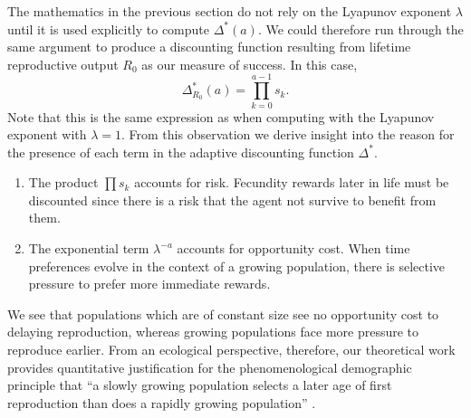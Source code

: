 \documentclass[titlepage, hidelinks, 12pt]{article}
\theoremstyle{plain}
\theoremstyle{remark}
\theoremstyle{definition}
\begin{document}
The mathematics in the previous section do not rely on the Lyapunov exponent $\lambda$ until it is used
explicitly to compute $\Delta^*(a)$. We could therefore
run through the same argument to produce a discounting function resulting from lifetime reproductive output $R_0$ as our measure of success. In this
case, 
\begin{equation}
    \Delta_{R_0}^*(a) = \prod\limits_{k = 0}^{a-1} s_k.
\end{equation}
Note that this is the same expression as when computing with the Lyapunov exponent with $\lambda = 1$. From this observation we derive insight into
the reason for the presence of each term in the adaptive discounting function $\Delta^*$. 
\begin{enumerate}
    \item The product $\prod s_k$ accounts for risk. Fecundity rewards later in life must be discounted since there is a risk that the
        agent not survive to benefit from them.
    \item The exponential term $\lambda^{-a}$ accounts for opportunity cost. When time preferences evolve in the context of a growing
        population, there is selective pressure to prefer more immediate rewards. 
\end{enumerate}

We see that populations which are of constant size see no opportunity cost to delaying
reproduction, whereas growing populations face more pressure to reproduce earlier. 
From an ecological perspective, therefore, our theoretical work provides quantitative justification for the phenomenological demographic principle that
``a slowly growing population selects a later age of first reproduction than does a rapidly growing population''  
\cite{bull04}.  

\end{document}
